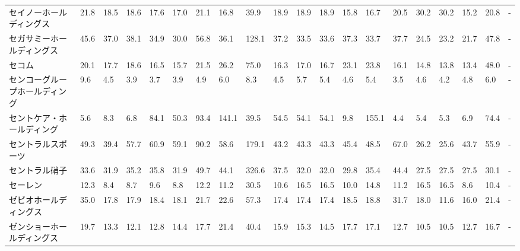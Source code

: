 \begin{tabular}{llllllllllllllllllll}
セイノーホールディングス    &   21.8 &   18.5 &      18.6 &      17.6 &       17.0 &    21.1 &    16.8 &     39.9 &    18.9 &    18.9 &   18.9 &   15.8 &    16.7 &    20.5 &    30.2 &   30.2 &   15.2 &    20.8 &      - \\
セガサミーホールディングス   &   45.6 &   37.0 &      38.1 &      34.9 &       30.0 &    56.8 &    36.1 &    128.1 &    37.2 &    33.5 &   33.6 &   37.3 &    33.7 &    37.7 &    24.5 &   23.2 &   21.7 &    47.8 &      - \\
セコム             &   20.1 &   17.7 &      18.6 &      16.5 &       15.7 &    21.5 &    26.2 &     75.0 &    16.3 &    17.0 &   16.7 &   23.1 &    23.8 &    16.1 &    14.8 &   13.8 &   13.4 &    48.0 &      - \\
センコーグループホールディング &    9.6 &    4.5 &       3.9 &       3.7 &        3.9 &     4.9 &     6.0 &      8.3 &     4.5 &     5.7 &    5.4 &    4.6 &     5.4 &     3.5 &     4.6 &    4.2 &    4.8 &     6.0 &      - \\
セントケア・ホールディング   &    5.6 &    8.3 &       6.8 &      84.1 &       50.3 &    93.4 &   141.1 &     39.5 &    54.5 &    54.1 &   54.1 &    9.8 &   155.1 &     4.4 &     5.4 &    5.3 &    6.9 &    74.4 &      - \\
セントラルスポーツ       &   49.3 &   39.4 &      57.7 &      60.9 &       59.1 &    90.2 &    58.6 &    179.1 &    43.2 &    43.3 &   43.3 &   45.4 &    48.5 &    67.0 &    26.2 &   25.6 &   43.7 &    55.9 &      - \\
セントラル硝子         &   33.6 &   31.9 &      35.2 &      35.8 &       31.9 &    49.7 &    44.1 &    326.6 &    37.5 &    32.0 &   32.0 &   29.8 &    35.4 &    44.4 &    27.5 &   27.5 &   27.5 &    30.1 &      - \\
セーレン            &   12.3 &    8.4 &       8.7 &       9.6 &        8.8 &    12.2 &    11.2 &     30.5 &    10.6 &    16.5 &   16.5 &   10.0 &    14.8 &    11.2 &    16.5 &   16.5 &    8.6 &    10.4 &      - \\
ゼビオホールディングス     &   35.0 &   17.8 &      17.9 &      18.4 &       18.1 &    21.7 &    22.6 &     57.3 &    17.4 &    17.4 &   17.4 &   18.5 &    18.8 &    31.7 &    18.0 &   11.6 &   16.0 &    21.4 &      - \\
ゼンショーホールディングス   &   19.7 &   13.3 &      12.1 &      12.8 &       14.4 &    17.7 &    21.4 &     40.4 &    15.9 &    15.3 &   14.5 &   17.7 &    17.1 &    12.7 &    10.5 &   10.5 &   12.7 &    16.7 &      - \\

\end{tabular}
